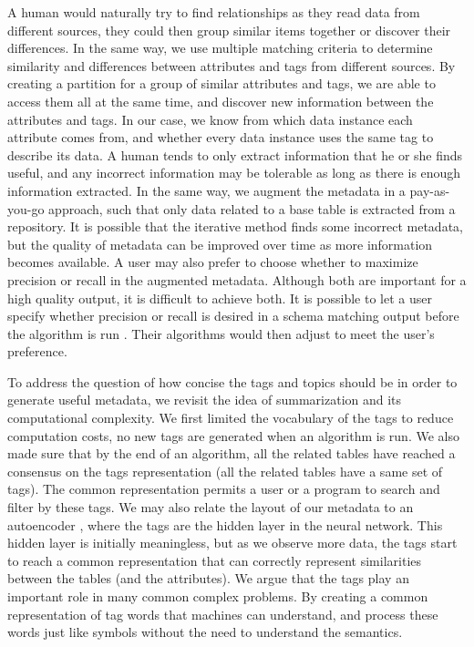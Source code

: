 A human would naturally try to find relationships as they read data from different sources, they could then group similar items together or discover their differences. In the same way, we use multiple matching criteria to determine similarity and differences between attributes and tags from different sources. By creating a partition for a group of similar attributes and tags, we are able to access them all at the same time, and discover new information between the attributes and tags. In our case, we know from which data instance each attribute comes from, and whether every data instance uses the same tag to describe its data. A human tends to only extract information that he or she finds useful, and any incorrect information may be tolerable as long as there is enough information extracted. In the same way, we augment the metadata in a pay-as-you-go approach, such that only data related to a base table is extracted from a repository. It is possible that the iterative method finds some incorrect metadata, but the quality of metadata can be improved over time as more information becomes available. A user may also prefer to choose whether to maximize precision or recall in the augmented metadata. Although both are important for a high quality output, it is difficult to achieve both. It is possible to let a user specify whether precision or recall is desired in a schema matching output before the algorithm is run \cite{Duchateau2009YAM}. Their algorithms would then adjust to meet the user's preference.

To address the question of how concise the tags and topics should be in order to generate useful metadata, we revisit the idea of summarization and its computational complexity. We first limited the vocabulary of the tags to reduce computation costs, no new tags are generated when an algorithm is run. We also made sure that by the end of an algorithm, all the related tables have reached a consensus on the tags representation (all the related tables have a same set of tags). The common representation permits a user or a program to search and filter by these tags. We may also relate the layout of our metadata to an autoencoder \cite{kipf2017semisupervised}, where the tags are the hidden layer in the neural network. This hidden layer is initially meaningless, but as we observe more data, the tags start to reach a common representation that can correctly represent similarities between the tables (and the attributes). We argue that the tags play an important role in many common complex problems. By creating a common representation of tag words that machines can understand, and process these words just like symbols without the need to understand the semantics.

